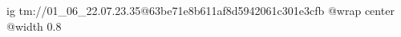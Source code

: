  
 
 
 
 

\qqSecCmtScr


\ifcmt
  ig tm://01_06_22.07.23.35@63be71e8b611af8d5942061c301e3cfb
  @wrap center
  @width 0.8
\fi


